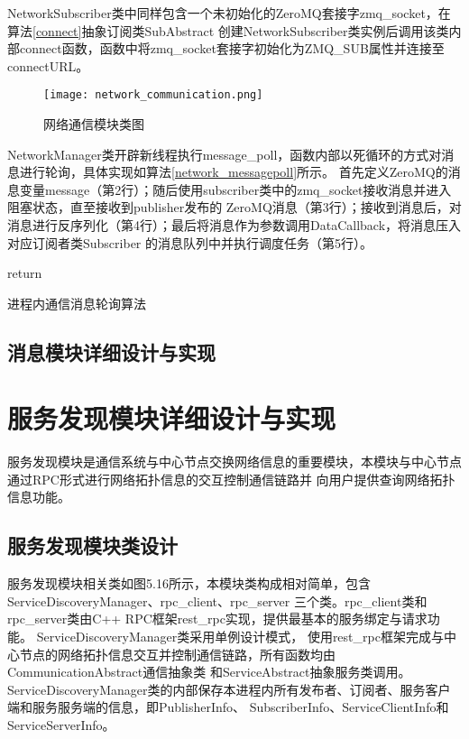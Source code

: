 NetworkSubscriber类中同样包含一个未初始化的ZeroMQ套接字zmq\_socket，在算法\ref{connect}抽象订阅类SubAbstract
创建NetworkSubscriber类实例后调用该类内部connect函数，函数中将zmq\_socket套接字初始化为ZMQ\_SUB属性并连接至connectURL。
\begin{figure}[H]
  \centering
  \texttt{[image: network\_communication.png]}
  \caption{网络通信模块类图}
  \label{network_communication}
\end{figure}
NetworkManager类开辟新线程执行message\_poll，函数内部以死循环的方式对消息进行轮询，具体实现如算法\ref{network_messagepoll}所示。
首先定义ZeroMQ的消息变量message（第2行）；随后使用subscriber类中的zmq\_socket接收消息并进入阻塞状态，直至接收到publisher发布的
ZeroMQ消息（第3行）；接收到消息后，对消息进行反序列化（第4行）；最后将消息作为参数调用DataCallback，将消息压入对应订阅者类Subscriber
的消息队列中并执行调度任务（第5行）。
\begin{algorithm}
  \small
  \SetAlgoLined
  return 
  \caption{进程内通信消息轮询算法}
  \label{network_messagepoll}
\end{algorithm}

\subsection{消息模块详细设计与实现}

















\section{服务发现模块详细设计与实现}
服务发现模块是通信系统与中心节点交换网络信息的重要模块，本模块与中心节点通过RPC形式进行网络拓扑信息的交互控制通信链路并
向用户提供查询网络拓扑信息功能。

\subsection{服务发现模块类设计}
服务发现模块相关类如图5.16所示，本模块类构成相对简单，包含ServiceDiscoveryManager、rpc\_client、rpc\_server
三个类。rpc\_client类和rpc\_server类由C++ RPC框架rest\_rpc实现，提供最基本的服务绑定与请求功能。
ServiceDiscoveryManager类采用单例设计模式，
使用rest\_rpc框架完成与中心节点的网络拓扑信息交互并控制通信链路，所有函数均由CommunicationAbstract通信抽象类
和ServiceAbstract抽象服务类调用。ServiceDiscoveryManager类的内部保存本进程内所有发布者、订阅者、服务客户端和服务服务端的信息，即PublisherInfo、
SubscriberInfo、ServiceClientInfo和ServiceServerInfo。

